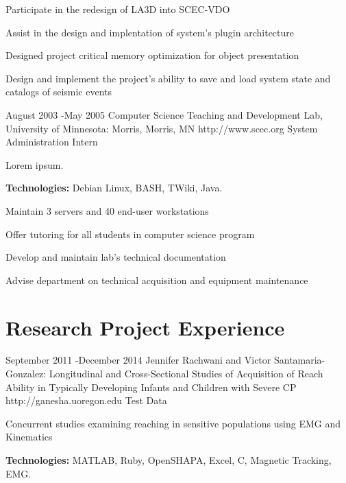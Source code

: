 \documentclass[10pt]{article} %
\begin{document}
\begin{itemize-noindent}
\item{Participate in the redesign of LA3D into SCEC-VDO}
\item{Assist in the design and implentation of system's plugin architecture}
\item{Designed project critical memory optimization for object presentation}
\item{Design and implement the project's ability to save and load system state and catalogs of seismic events}
\end{itemize-noindent}


\job
{August 2003 -}{May 2005}
{Computer Science Teaching and Development Lab, University of Minnesota: Morris, Morris, MN}
{http://www.scec.org}
{System Administration Intern}
{Lorem ipsum. \\
\rule{0mm}{5mm}\textbf{Technologies:} Debian Linux, BASH, TWiki, Java.}

\begin{itemize-noindent}
\item{Maintain 3 servers and 40 end-user workstations}
\item{Offer tutoring for all students in computer science program}
\item{Develop and maintain lab's technical documentation}
\item{Advise department on technical acquisition and equipment maintenance}
\end{itemize-noindent}


\section{Research Project Experience}

\job
{September 2011 -}{December 2014}
{Jennifer Rachwani and Victor Santamaria-Gonzalez: Longitudinal and Cross-Sectional Studies of Acquisition of Reach Ability in Typically Developing Infants and Children with Severe CP}
{http://ganesha.uoregon.edu}
{Test Data}
{Concurrent studies examining reaching in sensitive populations using EMG and Kinematics \\ 
\rule{0mm}{5mm}\textbf{Technologies:} MATLAB, Ruby, OpenSHAPA, Excel, C, Magnetic Tracking, EMG.}
\end{document}
